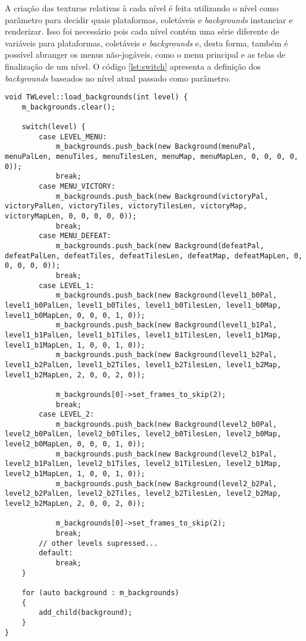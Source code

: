 A criação das texturas relativas à cada nível é feita utilizando o nível como parâmetro para decidir quais plataformas, coletáveis e \textit{backgrounds} instanciar e renderizar. Isso foi necessário pois cada nível contém uma série diferente de variáveis para plataformas, coletáveis e \textit{backgrounds} e, desta forma, também é possível abranger os menus não-jogáveis, como o menu principal e as telas de finalização de um nível. O código \ref{lst:switch} apresenta a definição dos \textit{backgrounds} baseados no nível atual passado como parâmetro.

\begin{lstlisting}[label={lst:switch},caption={Definição dos \textit{backgrounds} baseado no nível passado.]}]
void TWLevel::load_backgrounds(int level) {
    m_backgrounds.clear();

    switch(level) {
        case LEVEL_MENU:
            m_backgrounds.push_back(new Background(menuPal, menuPalLen, menuTiles, menuTilesLen, menuMap, menuMapLen, 0, 0, 0, 0, 0));
            break;
        case MENU_VICTORY:
            m_backgrounds.push_back(new Background(victoryPal, victoryPalLen, victoryTiles, victoryTilesLen, victoryMap, victoryMapLen, 0, 0, 0, 0, 0));
            break;
        case MENU_DEFEAT:
            m_backgrounds.push_back(new Background(defeatPal, defeatPalLen, defeatTiles, defeatTilesLen, defeatMap, defeatMapLen, 0, 0, 0, 0, 0));
            break;
        case LEVEL_1:
            m_backgrounds.push_back(new Background(level1_b0Pal, level1_b0PalLen, level1_b0Tiles, level1_b0TilesLen, level1_b0Map, level1_b0MapLen, 0, 0, 0, 1, 0));
            m_backgrounds.push_back(new Background(level1_b1Pal, level1_b1PalLen, level1_b1Tiles, level1_b1TilesLen, level1_b1Map, level1_b1MapLen, 1, 0, 0, 1, 0));
            m_backgrounds.push_back(new Background(level1_b2Pal, level1_b2PalLen, level1_b2Tiles, level1_b2TilesLen, level1_b2Map, level1_b2MapLen, 2, 0, 0, 2, 0));

            m_backgrounds[0]->set_frames_to_skip(2);
            break;
        case LEVEL_2:
            m_backgrounds.push_back(new Background(level2_b0Pal, level2_b0PalLen, level2_b0Tiles, level2_b0TilesLen, level2_b0Map, level2_b0MapLen, 0, 0, 0, 1, 0));
            m_backgrounds.push_back(new Background(level2_b1Pal, level2_b1PalLen, level2_b1Tiles, level2_b1TilesLen, level2_b1Map, level2_b1MapLen, 1, 0, 0, 1, 0));
            m_backgrounds.push_back(new Background(level2_b2Pal, level2_b2PalLen, level2_b2Tiles, level2_b2TilesLen, level2_b2Map, level2_b2MapLen, 2, 0, 0, 2, 0));

            m_backgrounds[0]->set_frames_to_skip(2);
            break;
        // other levels supressed...
        default:
            break;
    }

    for (auto background : m_backgrounds)
    {
        add_child(background);
    }
}
\end{lstlisting}